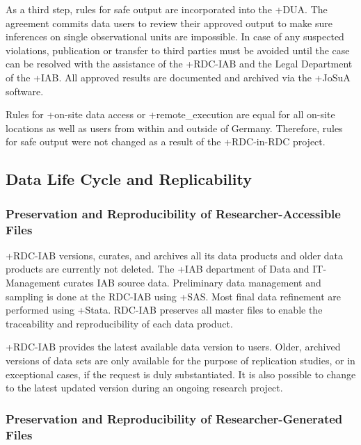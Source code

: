 \documentclass[
]{WileySix}
\begin{document}
As a third step, rules for safe output are incorporated into the +DUA\textbar. The agreement commits data users to review their approved output to make sure inferences on single observational units are impossible. In case of any suspected violations, publication or transfer to third parties must be avoided until the case can be resolved with the assistance of the +RDC-IAB\textbar{} and the Legal Department of the +IAB\textbar. All approved results are documented and archived via the +JoSuA\textbar{} software.

Rules for +on-site\textbar{} data access or +remote\_execution\textbar{} are equal for all on-site locations as well as users from within and outside of Germany. Therefore, rules for safe output were not changed as a result of the +RDC-in-RDC\textbar{} project.

\hypertarget{data-life-cycle-and-replicability}{%
\subsection{Data Life Cycle and Replicability}\label{data-life-cycle-and-replicability}}

\hypertarget{preservation-and-reproducibility-of-researcher-accessible-files}{%
\subsubsection{Preservation and Reproducibility of Researcher-Accessible Files}\label{preservation-and-reproducibility-of-researcher-accessible-files}}

+RDC-IAB\textbar{} versions, curates, and archives all its data products and older data products are currently not deleted. The +IAB\textbar{} department of Data and IT-Management curates IAB source data. Preliminary data management and sampling is done at the RDC-IAB using +SAS\textbar. Most final data refinement are performed using +Stata\textbar. RDC-IAB preserves all master files to enable the traceability and reproducibility of each data product.

+RDC-IAB\textbar{} provides the latest available data version to users. Older, archived versions of data sets are only available for the purpose of replication studies, or in exceptional cases, if the request is duly substantiated. It is also possible to change to the latest updated version during an ongoing research project.

\hypertarget{preservation-and-reproducibility-of-researcher-generated-files}{%
\subsubsection{Preservation and Reproducibility of Researcher-Generated Files}\label{preservation-and-reproducibility-of-researcher-generated-files}}
\end{document}
